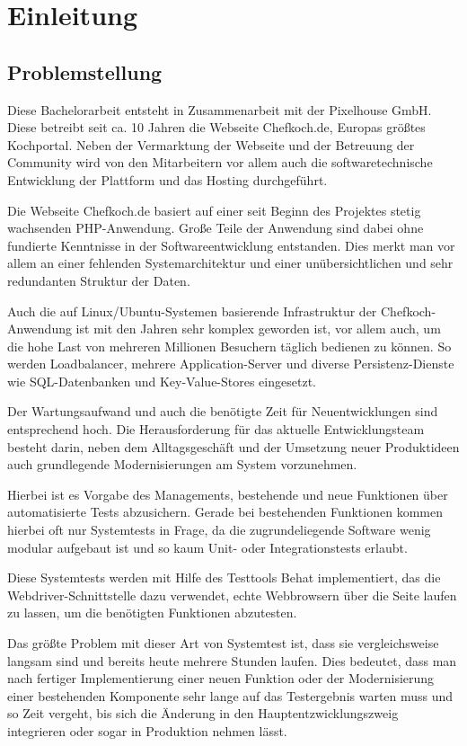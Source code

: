 \section{Einleitung}

\subsection{Problemstellung}

Diese Bachelorarbeit entsteht in Zusammenarbeit mit der Pixelhouse GmbH. Diese betreibt seit ca. 10 Jahren die Webseite Chefkoch.de, Europas größtes Kochportal. Neben der Vermarktung der Webseite und der Betreuung der Community wird von den Mitarbeitern vor allem auch die softwaretechnische Entwicklung der Plattform und das Hosting durchgeführt.

Die Webseite Chefkoch.de basiert auf einer seit Beginn des Projektes stetig wachsenden PHP-Anwendung. Große Teile der Anwendung sind dabei ohne fundierte Kenntnisse in der Softwareentwicklung entstanden. Dies merkt man vor allem an einer fehlenden Systemarchitektur und einer unübersichtlichen und sehr redundanten Struktur der Daten.

Auch die auf Linux/Ubuntu-Systemen basierende Infrastruktur der Chefkoch-Anwendung ist mit den Jahren sehr komplex geworden ist, vor allem auch, um die hohe Last von mehreren Millionen Besuchern täglich bedienen zu können. So werden Loadbalancer, mehrere Application-Server und diverse Persistenz-Dienste wie SQL-Datenbanken und Key-Value-Stores eingesetzt.

Der Wartungsaufwand und auch die benötigte Zeit für Neuentwicklungen sind entsprechend hoch. Die Herausforderung für das aktuelle Entwicklungsteam besteht darin, neben dem Alltagsgeschäft und der Umsetzung neuer Produktideen auch grundlegende Modernisierungen am System vorzunehmen.

Hierbei ist es Vorgabe des Managements, bestehende und neue Funktionen über automatisierte Tests abzusichern. Gerade bei bestehenden Funktionen kommen hierbei oft nur Systemtests in Frage, da die zugrundeliegende Software wenig modular aufgebaut ist und so kaum Unit- oder Integrationstests erlaubt.

Diese Systemtests werden mit Hilfe des Testtools Behat implementiert, das die Webdriver-Schnittstelle dazu verwendet, echte Webbrowsern über die Seite laufen zu lassen, um die benötigten Funktionen abzutesten.

Das größte Problem mit dieser Art von Systemtest ist, dass sie vergleichsweise langsam sind und bereits heute mehrere Stunden laufen. Dies bedeutet, dass man nach fertiger Implementierung einer neuen Funktion oder der Modernisierung einer bestehenden Komponente sehr lange auf das Testergebnis warten muss und so Zeit vergeht, bis sich die Änderung in den Hauptentzwicklungszweig integrieren oder sogar in Produktion nehmen lässt.

